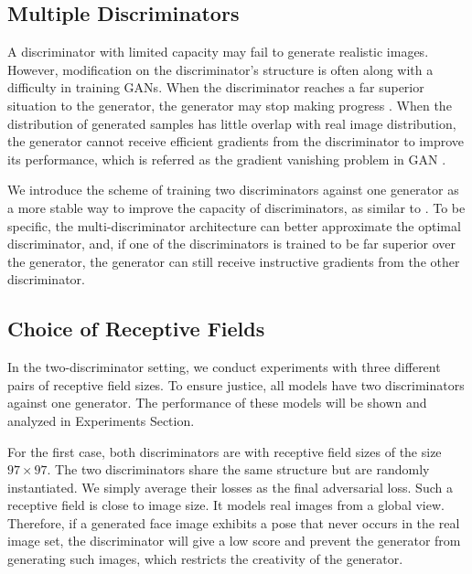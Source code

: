 \documentclass[letterpaper]{article} %
\begin{document}
	\subsection{Multiple Discriminators}
	A discriminator with limited capacity may fail to generate realistic images. However, modification on the discriminator's structure is often along with a difficulty in training GANs. When the discriminator reaches a far superior situation to the generator, the generator may stop making progress \cite{durugkar2016generative,arjovsky2017towards,neyshabur2017stabilizing}. When the distribution of generated samples has little overlap with real image distribution, the generator cannot receive efficient gradients from the discriminator to improve its performance, which is referred as the gradient vanishing problem in GAN \cite{arjovsky2017wasserstein}.
	
	We introduce the scheme of training two discriminators against one generator as a more stable way to improve the capacity of discriminators, as similar to \cite{durugkar2016generative}. To be specific, the multi-discriminator architecture can better approximate the optimal discriminator, and, if one of the discriminators is trained to be far superior over the generator, the generator can still receive instructive gradients from the other discriminator. %
	
	\subsection{Choice of Receptive Fields}
	In the two-discriminator setting, we conduct experiments with three different pairs of receptive field sizes. To ensure justice, all models have two discriminators against one generator. The performance of these models will be shown and analyzed in Experiments Section. 
	
	For the first case, both discriminators are with  receptive field sizes of the size $97\times97$. The two discriminators share the same structure but are randomly instantiated. We simply average their losses as the final adversarial loss.  Such a receptive field is close to image size. It models real images from a global view. Therefore, if a generated face image exhibits a pose that never occurs in the real image set, the discriminator will give a low score and prevent the generator from generating such images, which restricts the creativity of the generator.
	
\end{document}
